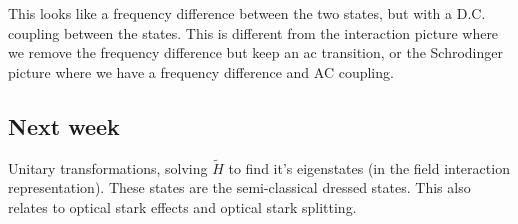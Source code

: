 This looks like a frequency difference between the two states, but with a D.C. coupling between the states. This is different from the interaction picture where we remove the frequency difference but keep an ac transition, or the Schrodinger picture where we have a frequency difference and AC coupling.
\subsection{Next week}
Unitary transformations, solving $\tilde{H}$ to find it's eigenstates (in the field interaction representation). These states are the semi-classical dressed states. This also relates to optical stark effects and optical stark splitting.
